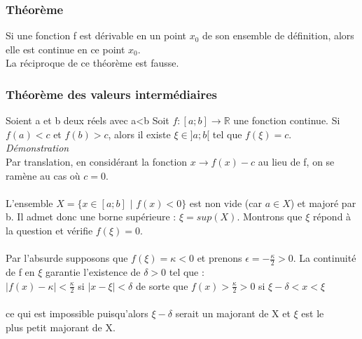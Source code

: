 \documentclass[a4paper,10pt]{book}
\newcommand{\R}{\mathbb{R}}
\begin{document}
\subsubsection{Théorème}
Si une fonction f est dérivable en un point $x_{0}$ de son ensemble de définition, alors elle est continue en ce point $x_{0}$.\\
La réciproque de ce théorème est fausse.

\subsubsection{Théorème des valeurs intermédiaires}
Soient a et b deux réels avec a<b Soit $f : [a;b] \longrightarrow \R$ une fonction continue. Si $f(a)<c$ et $f(b)>c$, alors il existe $\xi \in ]a;b[$ tel que $f(\xi)=c$.\\

\textit{Démonstration}\\
Par translation, en considérant la fonction $x \longrightarrow f(x)-c$ au lieu de f, on se ramène au cas où $c=0$.\\\\
L’ensemble $X=\{x \in [a;b]$ $|$ $f(x)<0\}$ est non vide (car $a \in X$) et majoré par b. Il admet donc une borne supérieure : $\xi=sup(X)$. Montrons que $\xi$ répond à la question et vérifie $f(\xi)=0$.\\\\
Par l’absurde supposons que $f(\xi)=\kappa <0$ et prenons $\epsilon =-\frac{\kappa}{2}>0$. La continuité de f en $\xi$ garantie l’existence de $\delta >0$ tel que :\\

$|f(x)-\kappa |<\frac{\kappa}{2}$ si $|x-\xi |<\delta$ de sorte que $f(x)>\frac{\kappa}{2}>0$ si $\xi -\delta <x<\xi$\\\\
ce qui est impossible puisqu'alors $\xi -\delta$ serait un majorant de X et $\xi$ est le\\ plus petit majorant de X.\\
\end{document}
